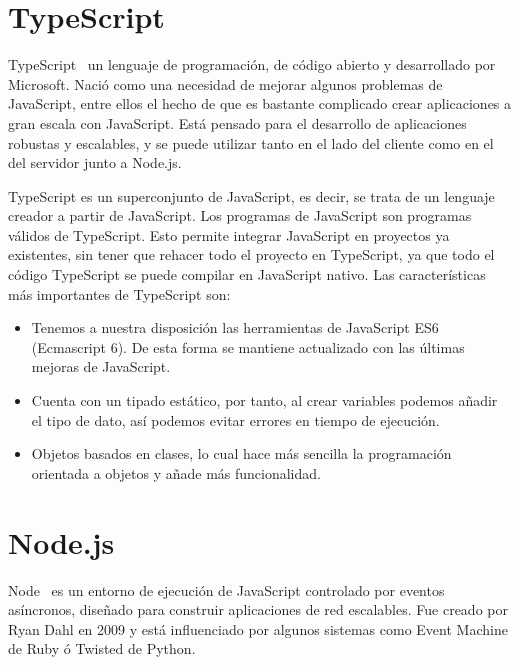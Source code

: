 \documentclass[a4paper, 12pt]{book}
\begin{document}
\section{TypeScript} 
\label{sec:typescript}

TypeScript~\cite{typescript} un lenguaje de programación, de código abierto y desarrollado por Microsoft.
Nació como una necesidad de mejorar algunos problemas de JavaScript, entre ellos el hecho de que es bastante complicado crear aplicaciones a gran escala con JavaScript. Está pensado para el desarrollo de aplicaciones robustas y escalables, y se puede utilizar tanto en el lado del cliente como en el del servidor junto a Node.js.

TypeScript es un superconjunto de JavaScript, es decir, se trata de un lenguaje creador a partir de JavaScript. Los programas de JavaScript son programas válidos de TypeScript. Esto permite integrar JavaScript en proyectos ya existentes, sin tener que rehacer todo el proyecto en TypeScript, ya que todo el código TypeScript se puede compilar en JavaScript nativo.
Las características más importantes de TypeScript son:

\begin{itemize}

	\item Tenemos a nuestra disposición las herramientas de JavaScript ES6 (Ecmascript 6). De esta forma se mantiene actualizado con las últimas mejoras de JavaScript.

	\item Cuenta con un tipado estático, por tanto, al crear variables podemos añadir el tipo de dato, así podemos evitar errores en tiempo de ejecución.

	\item Objetos basados en clases, lo cual hace más sencilla la programación orientada a objetos y añade más funcionalidad.

\end{itemize}

\section{Node.js} 
\label{sec:nodejs}

Node~\cite{nodejs} es un entorno de ejecución de JavaScript controlado por eventos asíncronos, diseñado para construir aplicaciones de red escalables.
Fue creado por Ryan Dahl en 2009 y está influenciado por algunos sistemas como Event Machine de Ruby ó Twisted de Python.
\end{document}
